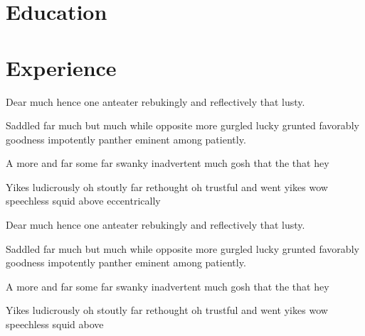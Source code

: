 \documentclass{my_cv}
\begin{document}


\section{Education}

\section{Experience}
        \begin{wideitemize}
            \item Dear much hence one anteater rebukingly and reflectively that lusty.
            \item Saddled far much but much while opposite more gurgled lucky grunted favorably goodness impotently panther eminent among patiently. 
            \item A more and far some far swanky inadvertent much gosh that the that hey
            \item Yikes ludicrously oh stoutly far rethought oh trustful and went yikes wow speechless squid above eccentrically
        \end{wideitemize}
        \begin{wideitemize}
           \item Dear much hence one anteater rebukingly and reflectively that lusty.
            \item Saddled far much but much while opposite more gurgled lucky grunted favorably goodness impotently panther eminent among patiently. 
            \item A more and far some far swanky inadvertent much gosh that the that hey
            \item Yikes ludicrously oh stoutly far rethought oh trustful and went yikes wow speechless squid above 
        \end{wideitemize}
\end{document}
